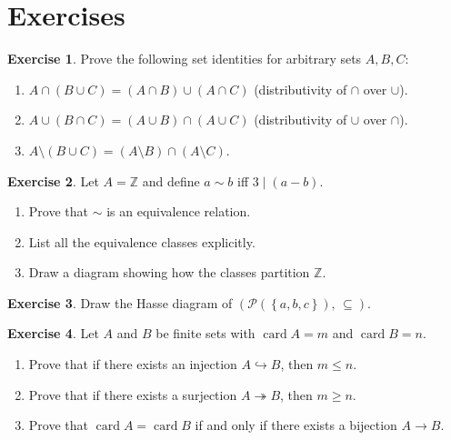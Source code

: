 \documentclass[12pt,a4paper,openany]{book}
\theoremstyle{definition}
\newtheorem{exercise}{Exercise}[chapter]
\theoremstyle{plain}
\theoremstyle{remark}
\newcommand{\Z}{\mathbb{Z}}
\newcommand{\set}[1]{\left\{#1\right\}}
\newcommand{\powerset}{\mathcal{P}}
\DeclareMathOperator{\card}{card}
\begin{document}
\section{Exercises}
\label{sec:ch3-exercises}

\begin{exercise}\label{exer:set-identities}
Prove the following set identities for arbitrary sets $A, B, C$:
\begin{enumerate}[label=(\alph*)]
  \item $A \cap (B \cup C) = (A \cap B) \cup (A \cap C)$ \quad
        (distributivity of $\cap$ over $\cup$).
  \item $A \cup (B \cap C) = (A \cup B) \cap (A \cup C)$ \quad
        (distributivity of $\cup$ over $\cap$).
  \item $A \setminus (B \cup C) = (A \setminus B) \cap (A \setminus C)$.
\end{enumerate}
\end{exercise}

\begin{exercise}\label{exer:equiv-rel}
Let $A = \Z$ and define $a \sim b$ iff $3 \mid (a - b)$.
\begin{enumerate}[label=(\alph*)]
  \item Prove that $\sim$ is an equivalence relation.
  \item List all the equivalence classes explicitly.
  \item Draw a diagram showing how the classes partition $\Z$.
\end{enumerate}
\end{exercise}

\begin{exercise}\label{exer:poset-powerset}
Draw the Hasse diagram of $(\powerset(\set{a,b,c}),\, \subseteq)$.
\end{exercise}

\begin{exercise}\label{exer:injection-surjection}
Let $A$ and $B$ be finite sets with $\card{A} = m$ and $\card{B} = n$.
\begin{enumerate}[label=(\alph*)]
  \item Prove that if there exists an injection $A \hookrightarrow B$,
        then $m \leq n$.
  \item Prove that if there exists a surjection $A \twoheadrightarrow B$,
        then $m \geq n$.
  \item Prove that $\card{A} = \card{B}$ if and only if there exists a
        bijection $A \to B$.
\end{enumerate}
\end{exercise}
\end{document}
